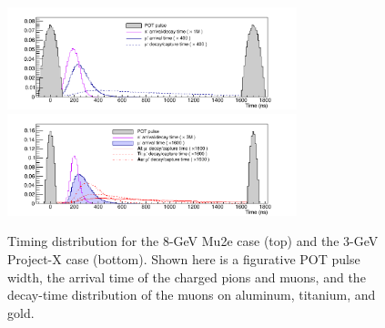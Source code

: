 


\begin{figure}[htb]
  \centering
  \includegraphics[width=0.75\textwidth]{ChargedLeptons/Figures/muon_fullCycle_Al_8GeV_Alt.pdf}
  \includegraphics[width=0.75\textwidth]{ChargedLeptons/Figures/muon_fullCycle_AlTiAu_3GeV_Alt.pdf}
  \caption{Timing distribution for the 8-GeV Mu2e case (top) and the 3-GeV Project-X case (bottom).  Shown
  here is a figurative POT pulse width, the arrival time of the
  charged pions and muons, and the decay-time distribution of the
  muons on aluminum, titanium, and gold.}
  \label{cl:fig:timing}
\end{figure}


